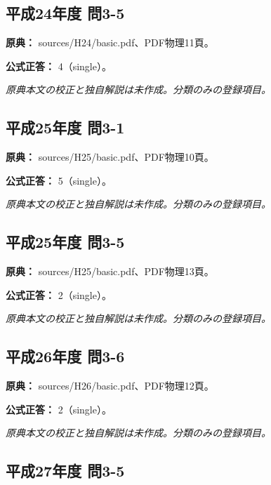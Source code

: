 \subsection{平成24年度 問3-5}
\label{q:h24-reg-basic-3-5}

\noindent\textbf{原典：} sources/H24/basic.pdf、PDF物理11頁。

\textbf{公式正答：} 4（single）。

\par\textit{原典本文の校正と独自解説は未作成。分類のみの登録項目。}

\subsection{平成25年度 問3-1}
\label{q:h25-reg-basic-3-1}

\noindent\textbf{原典：} sources/H25/basic.pdf、PDF物理10頁。

\textbf{公式正答：} 5（single）。

\par\textit{原典本文の校正と独自解説は未作成。分類のみの登録項目。}

\subsection{平成25年度 問3-5}
\label{q:h25-reg-basic-3-5}

\noindent\textbf{原典：} sources/H25/basic.pdf、PDF物理13頁。

\textbf{公式正答：} 2（single）。

\par\textit{原典本文の校正と独自解説は未作成。分類のみの登録項目。}

\subsection{平成26年度 問3-6}
\label{q:h26-reg-basic-3-6}

\noindent\textbf{原典：} sources/H26/basic.pdf、PDF物理12頁。

\textbf{公式正答：} 2（single）。

\par\textit{原典本文の校正と独自解説は未作成。分類のみの登録項目。}

\subsection{平成27年度 問3-5}
\label{q:h27-reg-basic-3-5}

